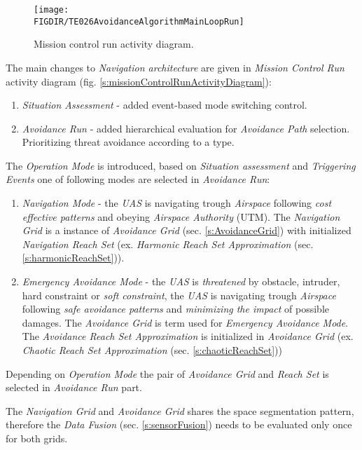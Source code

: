 \begin{figure}[H]
    \centering
    \texttt{[image: \\FIGDIR/TE026AvoidanceAlgorithmMainLoopRun]}
    \caption{Mission control run activity diagram.}
    \label{fig:missionControlRunActivityDiagram}
\end{figure}

\noindent The main changes to \emph{Navigation architecture} are given in \emph{Mission Control Run} activity diagram (fig. \ref{s:missionControlRunActivityDiagram}):

\begin{enumerate}
    \item \emph{Situation Assessment} - added event-based mode switching control. 
   
    \item \emph{Avoidance Run} - added hierarchical evaluation for \emph{Avoidance Path} selection. Prioritizing threat avoidance according to a type. 
\end{enumerate}

\newpage
\noindent The \emph{Operation Mode} is introduced, based on \emph{Situation assessment} and \emph{Triggering Events} one of following modes are selected in \emph{Avoidance Run}:

\begin{enumerate}
    \item \emph{Navigation Mode} - the \emph{UAS} is navigating trough \emph{Airspace} following \emph{cost effective patterns} and obeying \emph{Airspace Authority} (UTM). The \emph{Navigation Grid} is a instance of \emph{Avoidance Grid} (sec. \ref{s:AvoidanceGrid}) with initialized \emph{Navigation Reach Set} (ex. \emph{Harmonic Reach Set Approximation} (sec. \ref{s:harmonicReachSet})).
    
    \item \emph{Emergency Avoidance Mode} - the \emph{UAS} is \emph{threatened} by obstacle, intruder, hard constraint or \emph{soft constraint}, the \emph{UAS} is navigating trough \emph{Airspace} following \emph{safe avoidance patterns} and \emph{minimizing the impact} of possible damages. The \emph{Avoidance Grid} is term used for \emph{Emergency Avoidance Mode}. The \emph{Avoidance Reach Set Approximation} is initialized in \emph{Avoidance Grid} (ex. \emph{Chaotic Reach Set Approximation} (sec. \ref{s:chaoticReachSet}))
\end{enumerate}

\begin{note}
    Depending on \emph{Operation Mode} the pair of \emph{Avoidance Grid} and \emph{Reach Set} is selected in \emph{Avoidance Run} part.
    
    
    The \emph{Navigation Grid} and \emph{Avoidance Grid} shares the space segmentation pattern, therefore the \emph{Data Fusion} (sec. \ref{s:sensorFusion}) needs to be evaluated only once for both grids. 
\end{note}



